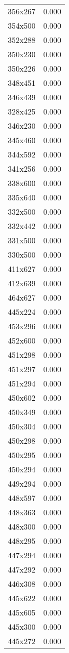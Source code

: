 \begin{table}
\begin{tabular}{lr}
356x267 & 0.000 \\
354x500 & 0.000 \\
352x288 & 0.000 \\
350x230 & 0.000 \\
350x226 & 0.000 \\
348x451 & 0.000 \\
346x439 & 0.000 \\
328x425 & 0.000 \\
346x230 & 0.000 \\
345x460 & 0.000 \\
344x592 & 0.000 \\
341x256 & 0.000 \\
338x600 & 0.000 \\
335x640 & 0.000 \\
332x500 & 0.000 \\
332x442 & 0.000 \\
331x500 & 0.000 \\
330x500 & 0.000 \\
411x627 & 0.000 \\
412x639 & 0.000 \\
464x627 & 0.000 \\
445x224 & 0.000 \\
453x296 & 0.000 \\
452x600 & 0.000 \\
451x298 & 0.000 \\
451x297 & 0.000 \\
451x294 & 0.000 \\
450x602 & 0.000 \\
450x349 & 0.000 \\
450x304 & 0.000 \\
450x298 & 0.000 \\
450x295 & 0.000 \\
450x294 & 0.000 \\
449x294 & 0.000 \\
448x597 & 0.000 \\
448x363 & 0.000 \\
448x300 & 0.000 \\
448x295 & 0.000 \\
447x294 & 0.000 \\
447x292 & 0.000 \\
446x308 & 0.000 \\
445x622 & 0.000 \\
445x605 & 0.000 \\
445x300 & 0.000 \\
445x272 & 0.000 \\

\end{tabular}
\end{table}
